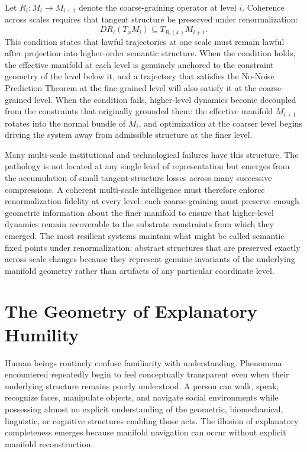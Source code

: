 \documentclass[11pt,a4paper,twocolumn]{article}
\begin{document}
Let $R_i : M_i \to M_{i+1}$ denote the coarse-graining operator
at level $i$. Coherence across scales requires that tangent structure
be preserved under renormalization:
\[
DR_i(T_x M_i) \subseteq T_{R_i(x)} M_{i+1}.
\]
This condition states that lawful trajectories at one scale must
remain lawful after projection into higher-order semantic structure.
When the condition holds, the effective manifold at each level is
genuinely anchored to the constraint geometry of the level below
it, and a trajectory that satisfies the No-Noise Prediction
Theorem at the fine-grained level will also satisfy it at the
coarse-grained level. When the condition fails, higher-level
dynamics become decoupled from the constraints that originally
grounded them: the effective manifold $M_{i+1}$ rotates into the
normal bundle of $M_i$, and optimization at the coarser level
begins driving the system away from admissible structure at the
finer level.

Many multi-scale institutional and technological failures have this
structure. The pathology is not located at any single level of
representation but emerges from the accumulation of small
tangent-structure losses across many successive compressions. A
coherent multi-scale intelligence must therefore enforce renormalization
fidelity at every level: each coarse-graining must preserve enough
geometric information about the finer manifold to ensure that
higher-level dynamics remain recoverable to the substrate constraints
from which they emerged. The most resilient systems maintain what
might be called semantic fixed points under renormalization: abstract
structures that are preserved exactly across scale changes because
they represent genuine invariants of the underlying manifold
geometry rather than artifacts of any particular coordinate level.


\section{The Geometry of Explanatory Humility}

Human beings routinely confuse familiarity with understanding.
Phenomena encountered repeatedly begin to feel conceptually
transparent even when their underlying structure remains
poorly understood. A person can walk, speak, recognize faces,
manipulate objects, and navigate social environments while
possessing almost no explicit understanding of the geometric,
biomechanical, linguistic, or cognitive structures enabling
those acts. The illusion of explanatory completeness emerges
because manifold navigation can occur without explicit
manifold reconstruction.
\end{document}
